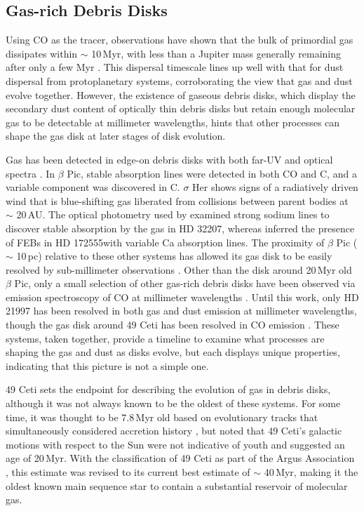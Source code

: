 \subsection{Gas-rich Debris Disks}

Using CO as the tracer, observations have shown that the bulk of primordial gas dissipates within $\sim$ 10\,Myr, with less than a Jupiter mass generally remaining after only a few Myr \citep{Zuck95}. This dispersal timescale lines up well with that for dust dispersal from protoplanetary systems, corroborating the view that gas and dust evolve together. However, the existence of gaseous debris disks, which display the secondary dust content of optically thin debris disks but retain enough molecular gas to be detectable at millimeter wavelengths, hints that other processes can shape the gas disk at later stages of disk evolution.  

Gas has been detected in edge-on debris disks with both far-UV \citep[$\beta$ Pic, $\sigma$ Her,][]{Robe00,Chen03} and optical spectra \citep[HD 32207, HD 172555,][]{Redf07,Kief14}. In $\beta$ Pic, stable absorption lines were detected in both CO and C, and a variable component was discovered in C. $\sigma$ Her shows signs of a radiatively driven wind that is blue-shifting gas liberated from collisions between parent bodies at $\sim$ 20\,AU. The optical photometry used by \citeauthor{Redf07} examined strong sodium lines to discover stable absorption by the gas in HD 32207, whereas \citeauthor{Kief14} inferred the presence of FEBs in HD 172555with variable Ca absorption lines. The proximity of $\beta$ Pic ($\sim$ 10\,pc) relative to these other systems has allowed its gas disk to be easily resolved by sub-millimeter observations \citep{Wiln11,Dent14}. Other than the disk around 20\,Myr old $\beta$ Pic, only a small selection of other gas-rich debris disks have been observed via emission spectroscopy of CO at millimeter wavelengths \citep[5\,Myr old HD 141569, 30\,Myr old HD 21997, 40\,Myr old 49 Ceti,][]{Wein00,Moor13,Kosp13, Zuck95}. Until this work, only HD 21997 has been resolved in both gas and dust emission at millimeter wavelengths, though the gas disk around 49 Ceti has been resolved in CO emission \citep{Hugh08}. These systems, taken together, provide a timeline to examine what processes are shaping the gas and dust as disks evolve, but each displays unique properties, indicating that this picture is not a simple one. 

49 Ceti sets the endpoint for describing the evolution of gas in debris disks, although it was not always known to be the oldest of these systems. For some time, it was thought to be 7.8\,Myr old based on evolutionary tracks that simultaneously considered accretion history \citep{Sies00,Thi01b}, but \cite{Rhee07} noted that 49 Ceti's galactic motions with respect to the Sun were not indicative of youth and suggested an age of 20\,Myr. With the classification of 49 Ceti as part of the Argus Association \citep{Zuck12}, this estimate was revised to its current best estimate of $\sim$ 40\,Myr, making it the oldest known main sequence star to contain a substantial reservoir of molecular gas. 

